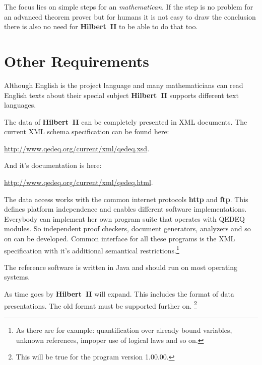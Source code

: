 \documentclass[a4paper,german,10pt,twoside]{book}
\theoremstyle{definition}
\theoremstyle{remark}
\begin{document}
\par
The focus lies on simple steps for an \emph{mathematican}. If the step is no problem for an advanced theorem prover but for humans it is not easy to draw the conclusion there is also no need for \textbf{Hilbert~II} to be able to do that too.



\chapter{Other Requirements\label{ch:other.requirements}} \label{chapter4} \hypertarget{chapter4}{}

Although English is the project language and many mathematicians can read English texts about their special subject \textbf{Hilbert~II} supports different text languages.

\par
The data of \textbf{Hilbert~II} can be completely presented in XML documents. The current XML schema specification can be found here:

\par
\url{http://www.qedeq.org/current/xml/qedeq.xsd}.

\par
And it's documentation is here:

\par
\url{http://www.qedeq.org/current/xml/qedeq.html}.

\par
The data access works with the common internet protocols \textbf{http} and \textbf{ftp}. This defines platform independence and enables different software implementations. Everybody can implement her own program suite that operates with QEDEQ modules. So independent proof checkers, document generators, analyzers and so on can be developed. Common interface for all these programs is the XML specification with it's additional semantical restrictions.\footnote{As there are for example: quantification over already bound variables, unknown references, impoper use of logical laws and so on.}

\par
The reference software is written in Java and should run on most operating systems. 

\par
As time goes by \textbf{Hilbert~II} will expand. This includes the format of data presentations. The old format must be supported further on. \footnote{This will be true for the program version 1.00.00.}
\end{document}
